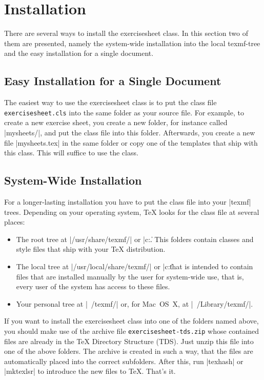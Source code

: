\documentclass[a4paper,fleqn,9pt]{report}
\def\exercisesheet{{exercisesheet}}
\begin{document}



\chapter{Installation}

There are several ways to install the \exercisesheet{} class. In this
section two of them are presented, namely the system-wide installation
into the local texmf-tree and the easy installation for a single
document.


\section{Easy Installation for a Single Document}

The easiest way to use the \exercisesheet{} class is to put the class
file \lstinline[language=bash]|exercisesheet.cls| into the same folder
as your source file. For example, to create a new exercise sheet, you
create a new folder, for instance called |mysheets/|, and put the
class file into this folder.  Afterwards, you create a new file
|mysheets.tex| in the same folder or copy one of the templates that
ship with this class. This will suffice to use the class.


\section{System-Wide Installation}

For a longer-lasting installation you have to put the class file into
your |texmf| trees. Depending on your operating system, \TeX{} looks
for the class file at several places:
\begin{itemize}
  \item The root tree at |/usr/share/texmf/| or |c:\texmf\|. This
    folders contain classes and style files that ship with your \TeX{}
    distribution.
  \item The local tree at |/usr/local/share/texmf/| or
    |c:\localtexmf\| that is intended to contain files that are
    installed manually by the user for system-wide use, that is, every
    user of the system has access to these files.
  \item Your personal tree at |~/texmf/| or, for Mac~OS~X, at
    |~/Library/texmf/|.
\end{itemize}
If you want to install the \exercisesheet{} class into one of the
folders named above, you should make use of the archive file
\lstinline[language=bash]{exercisesheet-tds.zip} whose contained
files are already in the \TeX{} Directory Structure (TDS). Just unzip
this file into one of the above folders. The archive is created in
such a way, that the files are automatically placed into the correct
subfolders. After this, run |texhash| or |mktexlsr| to introduce the
new files to \TeX. That's it.
\end{document}
